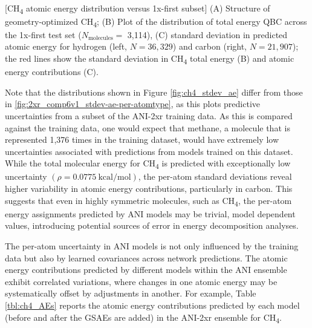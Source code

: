\begin{flushleft}
\begin{multiFigure}
     \\
[CH\textsubscript{4} atomic energy distribution versus 1x-first subset]{
(A) Structure of geometry-optimized CH\textsubscript{4}; 
(B) Plot of the distribution of total energy QBC across the 1x-first test set ($N_\text{molecules}=$ 3,114), 
(C) standard deviation in predicted atomic energy for hydrogen (left, $N=36,329$) and carbon (right, $N=21,907$); 
the red lines show the standard deviation in CH\textsubscript{4} total energy (B) and atomic energy contributions (C).
}
\label{fig:ch4_stdev_ae}
\end{multiFigure}
\end{flushleft}

Note that the distributions shown in Figure \ref{fig:ch4_stdev_ae} differ from those in \ref{fig:2xr_comp6v1_stdev-ae-per-atomtype}, as this plots predictive uncertainties from a subset of the ANI-2xr training data.
As this is compared against the training data, one would expect that methane, a molecule that is represented 1,376 times in the training dataset, would have extremely low uncertainties associated with predictions from models trained on this dataset.
While the total molecular energy for CH\textsubscript{4} is predicted with exceptionally low uncertainty $\left( \rho = 0.0775 \ \text{kcal/mol} \right)$, the per-atom standard deviations reveal higher variability in atomic energy contributions, particularly in carbon.
This suggests that even in highly symmetric molecules, such as CH\textsubscript{4}, the per-atom energy assignments predicted by ANI models may be trivial, model dependent values, introducing potential sources of error in energy decomposition analyses.

The per-atom uncertainty in ANI models is not only influenced by the training data but also by learned covariances across network predictions. 
The atomic energy contributions predicted by different models within the ANI ensemble exhibit correlated variations, where changes in one atomic energy may be systematically offset by adjustments in another.
For example, Table \ref{tbl:ch4_AEs} reports the atomic energy contributions predicted by each model (before and after the GSAEs are added) in the ANI-2xr ensemble for CH\textsubscript{4}.

